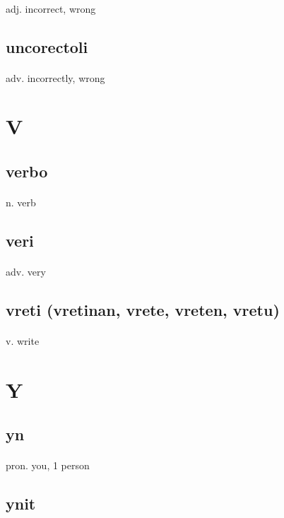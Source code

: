 \documentclass[UTF8]{article}
\begin{document}
    \paragraph{} adj. incorrect, wrong
    \subsection{uncorectoli}
    \paragraph{} adv. incorrectly, wrong
    \newpage \section{V}
    \subsection{verbo}
    \paragraph{} n. verb 
    \subsection{veri}
    \paragraph{} adv. very 
    \subsection{vreti (vretinan, vrete, vreten, vretu)}
    \paragraph{} v. write 
    \newpage \section{Y}
    \subsection{yn}
    \paragraph{} pron. you, 1 person 
    \subsection{ynit}
\end{document}
